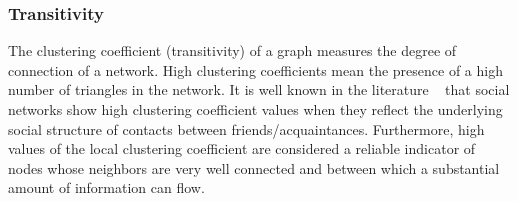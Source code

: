 \subsubsection{Transitivity} 
The clustering coefficient (transitivity) of a graph measures the degree of connection of a network. High clustering coefficients mean the presence of a high number of triangles in the network. It is well known in the literature ~\cite{wasserman1994social} that social networks show high clustering coefficient values when they reflect the underlying social structure of contacts between friends/acquaintances. 
Furthermore, high values of the local clustering coefficient are considered a reliable indicator of nodes whose neighbors are very well connected and between which a substantial amount of information can flow.
